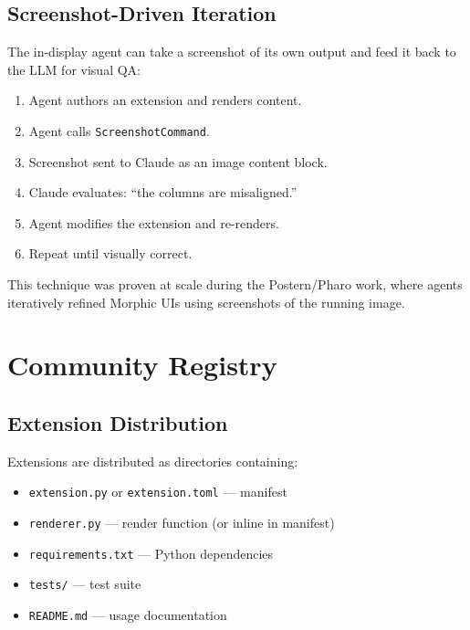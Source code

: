 \documentclass[a4paper,10pt]{article}
\begin{document}
\subsection{Screenshot-Driven Iteration}

The in-display agent can take a screenshot of its own output and
feed it back to the LLM for visual QA:

\begin{enumerate}[nosep]
  \item Agent authors an extension and renders content.
  \item Agent calls \texttt{ScreenshotCommand}.
  \item Screenshot sent to Claude as an image content block.
  \item Claude evaluates: ``the columns are misaligned.''
  \item Agent modifies the extension and re-renders.
  \item Repeat until visually correct.
\end{enumerate}

This technique was proven at scale during the Postern/Pharo work,
where agents iteratively refined Morphic UIs using screenshots
of the running image.

\section{Community Registry}

\subsection{Extension Distribution}

Extensions are distributed as directories containing:

\begin{itemize}[nosep]
  \item \texttt{extension.py} or \texttt{extension.toml} --- manifest
  \item \texttt{renderer.py} --- render function (or inline in
    manifest)
  \item \texttt{requirements.txt} --- Python dependencies
  \item \texttt{tests/} --- test suite
  \item \texttt{README.md} --- usage documentation
\end{itemize}
\end{document}
